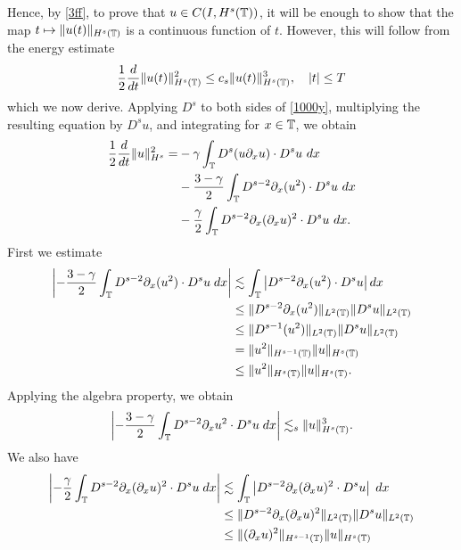Hence, by \eqref{3ff}, to prove that $u \in C(I, H^s(\mathbb{T}))$, it will be
enough to show that the map $t \mapsto \|u(t)\|_{H^s(\mathbb{T})}$ is a continuous
function of $t$. However, this will follow from the energy
estimate
\begin{equation}
\label{en-est-u}
\frac{1}{2} \frac{d}{dt} \|u(t)\|_{H^s(\mathbb{T})}^2
\le c_s \|u(t)\|_{H^s(\mathbb{T})}^3, \quad |t| \le T
\end{equation}
which we now derive. Applying $D^s$ to both sides of
\eqref{1000y}, multiplying the
resulting equation by $D^s u$, and integrating for $x\in \mathbb{T}$, we obtain
\begin{equation}
\begin{split}
\label{bound-int}
\frac 12
\frac{d}{dt} \|u \|_{H^s}^2
=
&-
\gamma \int_{\mathbb{T}}   D^s (u \partial_x u) \cdot
D^s u \  dx
\\
&- \frac{3 -\gamma}{2} \int_{\mathbb{T}}  D^{s-2} \partial_x (u^2) 
\cdot D^s u \ dx
\\
&- \frac{\gamma}{2} \int_{\mathbb{T}}   D^{s-2} \partial_x (\partial_x u)^2
\cdot D^s u \ dx.
\end{split}
\end{equation}
First we estimate
\begin{equation}
\begin{split}
\left | - \frac{3 -\gamma}{2} \int_{\mathbb{T}} D^{s-2} \partial_x (u^2) \cdot
D^s u \; dx \right |
& \lesssim 
\int_{\mathbb{T}} \left |
D^{s-2} \partial_x (u^2) \cdot D^s u \right | dx 
\\
& \le 
\|D^{s-2} \partial_x (u^2) \|_{L^2(\mathbb{T})} 
\|D^s u \|_{L^2(\mathbb{T})}
\\
& \le 
\|D^{s-1} (u^2) \|_{L^2(\mathbb{T})} 
\|D^s u \|_{L^2(\mathbb{T})}
\\
& = 
\| u^2 \|_{H^{s-1}(\mathbb{T})} \| u \|_{H^s(\mathbb{T})}
\\
& \le
\| u^2 \|_{H^s(\mathbb{T})} \| u
\|_{H^s(\mathbb{T})}.
\end{split}
\end{equation}
%
%
Applying the algebra property, we obtain
%
\begin{equation}
\label{hl1-prime}
\begin{split}
\left | -\frac{3 -\gamma}{2} \int_{\mathbb{T}} D^{s-2} \partial_x u^2 \cdot
D^s u \; dx \right |
\lesssim_{s}  \| u \|_{H^s(\mathbb{T})}^3.
\end{split}
\end{equation}
%
%
We also have
\begin{equation}
\begin{split}
\left | -\frac{\gamma}{2} \int_{\mathbb{T}} D^{s-2} \partial_x (\partial_x u)^2 \cdot
D^s u \; dx \right |
& \lesssim 
\int_{\mathbb{T}} \left | D^{s-2} \partial_x (\partial_x u)^2 
\cdot D^s u \right | \; dx
\\
& \le 
\| D^{s-2} \partial_x (\partial_x u)^2 \|_{L^2(\mathbb{T})}
\| D^s u \|_{L^2(\mathbb{T})}
\\
&  \le  \|(\partial_x u)^2
\|_{H^{s-1}(\mathbb{T})} \| u \|_{H^s(\mathbb{T})} 
\end{split}
\end{equation}
